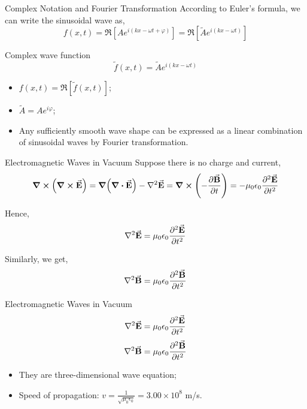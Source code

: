 \documentclass{beamer}
\begin{document}
\begin{frame}{Complex Notation and Fourier Transformation}
    According to Euler's formula, we can write the sinusoidal wave as,
    \begin{equation}
        f(x, t) = \Re [A e^{i(kx-\omega t + \varphi)}] = \Re[\tilde{A} e^{i(kx-\omega t)}]
    \end{equation}

    \begin{block}{Complex wave function}
        \begin{equation}
            \tilde{f}(x, t) = \tilde{A} e^{i(kx-\omega t)}
        \end{equation}
    \end{block}

    \begin{itemize}
        \item $f(x, t) = \Re[\tilde{f}(x, t)]$;
        \item $\tilde{A} = A e^{i \varphi}$;
        \item Any sufficiently smooth wave shape can be expressed as a linear combination of sinusoidal waves by Fourier transformation.
    \end{itemize}
\end{frame}


\begin{frame}{Electromagnetic Waves in Vacuum}
    Suppose there is no charge and current,
    \begin{equation}
        \curl(\curl \va{E}) = \grad(\div \va{E}) - \laplacian \va{E} = \curl \left( - \pdv{\va{B}}{t} \right) = -\mu_0 \epsilon_0 \pdv[2]{\va{E}}{t}
    \end{equation}

    Hence,
    \begin{equation}
        \laplacian \va{E} = \mu_0 \epsilon_0 \pdv[2]{\va{E}}{t}
    \end{equation}

    Similarly, we get,
    \begin{equation}
        \laplacian \va{B} = \mu_0 \epsilon_0 \pdv[2]{\va{B}}{t}
    \end{equation}
\end{frame}

\begin{frame}{Electromagnetic Waves in Vacuum}
    \begin{equation}
        \laplacian \va{E} = \mu_0 \epsilon_0 \pdv[2]{\va{E}}{t}
    \end{equation}
    \begin{equation}
        \laplacian \va{B} = \mu_0 \epsilon_0 \pdv[2]{\va{B}}{t}
    \end{equation}

    \begin{itemize}
        \item They are three-dimensional wave equation;
        \item Speed of propagation: $v = \frac{1}{\sqrt{\mu_0 \epsilon_0}} = 3.00 \times 10^8$ m/s.
    \end{itemize}
\end{frame}
\end{document}
